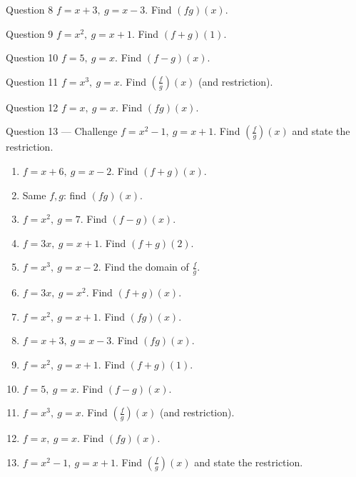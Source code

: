 \documentclass[11pt]{article}
\begin{document}
\begin{qbox}{Question 8}
$f=x+3,\ g=x-3$. Find $(fg)(x)$.\workspace{2.4cm}
\end{qbox}

\begin{qbox}{Question 9}
$f=x^2,\ g=x+1$. Find $(f+g)(1)$.\workspace{2.4cm}
\end{qbox}

\begin{qbox}{Question 10}
$f=5,\ g=x$. Find $(f-g)(x)$.\workspace{2.4cm}
\end{qbox}

\begin{qbox}{Question 11}
$f=x^3,\ g=x$. Find $\left(\tfrac fg\right)(x)$ (and restriction).\workspace{2.4cm}
\end{qbox}

\begin{qbox}{Question 12}
$f=x,\ g=x$. Find $(fg)(x)$.\workspace{2.4cm}
\end{qbox}

\begin{qbox}{Question 13 --- Challenge}
$f=x^2-1,\ g=x+1$. Find $\left(\tfrac fg\right)(x)$ and state the restriction.\workspace{3cm}
\end{qbox}

\clearpage
{}

\begin{recapbox}
\begin{multicols}{2}
\small
\begin{enumerate}[leftmargin=*,itemsep=3pt]
  \item $f=x+6,\ g=x-2$. Find $(f+g)(x)$.
  \item Same $f,g$: find $(fg)(x)$.
  \item $f=x^2,\ g=7$. Find $(f-g)(x)$.
  \item $f=3x,\ g=x+1$. Find $(f+g)(2)$.
  \item $f=x^3,\ g=x-2$. Find the domain of $\tfrac fg$.
  \item $f=3x,\ g=x^2$. Find $(f+g)(x)$.
  \item $f=x^2,\ g=x+1$. Find $(fg)(x)$.
  \item $f=x+3,\ g=x-3$. Find $(fg)(x)$.
  \item $f=x^2,\ g=x+1$. Find $(f+g)(1)$.
  \item $f=5,\ g=x$. Find $(f-g)(x)$.
  \item $f=x^3,\ g=x$. Find $\left(\tfrac fg\right)(x)$ (and restriction).
  \item $f=x,\ g=x$. Find $(fg)(x)$.
  \item $f=x^2-1,\ g=x+1$. Find $\left(\tfrac fg\right)(x)$ and state the restriction.
\end{enumerate}
\end{multicols}
\end{recapbox}
\end{document}
